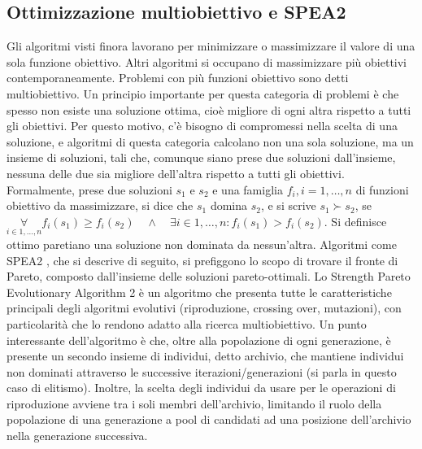\documentclass[12pt]{article}
\begin{document}
\subsection*{Ottimizzazione multiobiettivo e SPEA2}

Gli algoritmi visti finora lavorano per minimizzare o massimizzare il valore di una sola funzione obiettivo. Altri algoritmi si occupano di massimizzare più obiettivi contemporaneamente. Problemi con più funzioni obiettivo sono detti multiobiettivo. Un principio importante per questa categoria di problemi è che spesso non esiste una soluzione ottima, cioè migliore di ogni altra rispetto a tutti gli obiettivi. Per questo motivo, c'è bisogno di compromessi nella scelta di una soluzione, e algoritmi di questa categoria calcolano non una sola soluzione, ma un insieme di soluzioni, tali che, comunque siano prese due soluzioni dall'insieme, nessuna delle due sia migliore dell'altra rispetto a tutti gli obiettivi. Formalmente, prese due soluzioni $s_1$ e $s_2$ e una famiglia $f_i, i = 1,\dots,n$ di funzioni obiettivo da massimizzare, si dice che $s_1$ domina $s_2$, e si scrive $s_1 \succ s_2$, se\newline
 $\underset{i \in 1,\dots,n}{\forall} f_i(s_1) \geq f_i(s_2) \quad \land \quad \exists i \in 1,\dots,n : f_i(s_1) > f_i(s_2)$.\newline
Si definisce ottimo paretiano una soluzione non dominata da nessun'altra. Algoritmi come SPEA2 \cite{ZitzlerAl2001}, che si descrive di seguito, si prefiggono lo scopo di trovare il fronte di Pareto, composto dall'insieme delle soluzioni pareto-ottimali.\newline
\newline
Lo Strength Pareto Evolutionary Algorithm 2 è un algoritmo che presenta tutte le caratteristiche principali degli algoritmi evolutivi (riproduzione, crossing over, mutazioni), con particolarità che lo rendono adatto alla ricerca multiobiettivo. Un punto interessante dell'algoritmo è che, oltre alla popolazione di ogni generazione, è presente un secondo insieme di individui, detto archivio, che mantiene individui non dominati attraverso le successive iterazioni/generazioni (si parla in questo caso di elitismo). Inoltre, la scelta degli individui da usare per le operazioni di riproduzione avviene tra i soli membri dell'archivio, limitando il ruolo della popolazione di una generazione a pool di candidati ad una posizione dell'archivio nella generazione successiva. \newline
\newline
\end{document}
